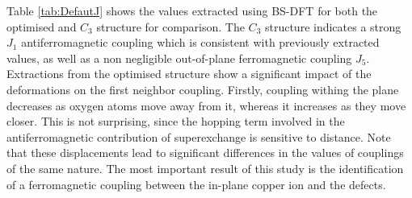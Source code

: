 \documentclass[12pt]{report}
\numberwithin{equation}{section}
\begin{document}
Table \ref{tab:DefautJ} shows the values extracted using BS-DFT for both the optimised and $C_3$ structure for comparison.
The $C_3$ structure indicates a strong $J_1$ antiferromagnetic coupling which is consistent with previously extracted values, as well as a non negligible out-of-plane ferromagnetic coupling $J_5$. 
Extractions from the optimised structure show a significant impact of the deformations on the first neighbor coupling.
Firstly, coupling withing the plane decreases as oxygen atoms move away from it, whereas it increases as they move closer. 
This is not surprising, since the hopping term involved in the antiferromagnetic contribution of superexchange is sensitive to distance.
Note that these displacements lead to significant differences in the values of couplings of the same nature.
The most important result of this study is the identification of a ferromagnetic coupling between the in-plane copper ion and the defects.







\end{document}
